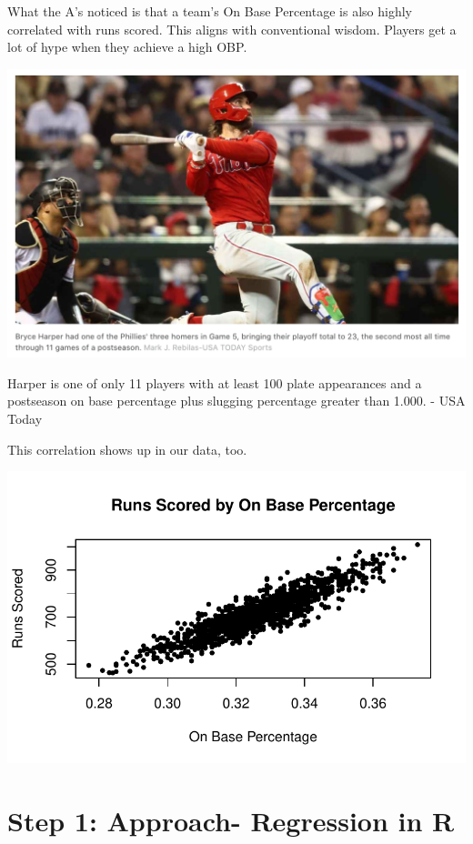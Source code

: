 \documentclass[
  letterpaper,
  DIV=11,
  numbers=noendperiod]{scrreprt}
\begin{document}
What the A's noticed is that a team's On Base Percentage is also highly
correlated with runs scored. This aligns with conventional wisdom.
Players get a lot of hype when they achieve a high OBP.

\includegraphics{images/harper.png}

Harper is one of only 11 players with at least 100 plate appearances and
a postseason on base percentage plus slugging percentage greater than
1.000. - USA Today

This correlation shows up in our data, too.

\includegraphics{08-Regression_files/figure-pdf/unnamed-chunk-5-1.pdf}

\hypertarget{step-1-approach--regression-in-r}{%
\section{Step 1: Approach- Regression in
R}\label{step-1-approach--regression-in-r}}
\end{document}
